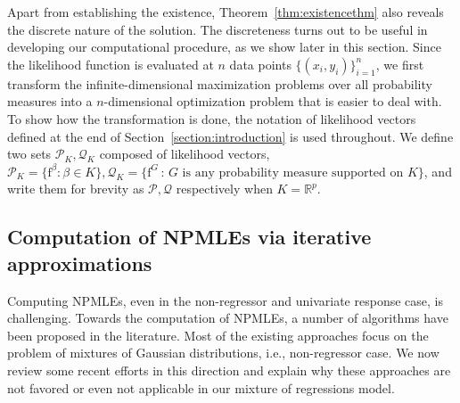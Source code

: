 \documentclass[11pt]{article}
\numberwithin{equation}{section}
\newcommand{\RS}{\mathbb{R}}
\newcommand{\PS}{\mathcal{P}}
\newcommand{\QS}{\mathcal{Q}}
\newcommand{\fv}{\mathrm{f}}
\begin{document}
Apart from establishing the existence, Theorem~\ref{thm:existencethm} also reveals the discrete nature of the solution. The discreteness turns out to be useful in developing our computational procedure, as we show later in this section. Since the likelihood function is evaluated at $n$ data points $\{(x_i,y_i)\}_{i=1}^n$, we first transform the infinite-dimensional maximization problems over all probability measures into a $n$-dimensional optimization problem that is easier to deal with. To show how the transformation is done, the notation of likelihood vectors defined at the end of Section~\ref{section:introduction} is used throughout. We define two sets $\PS_K, \QS_K$ composed of likelihood vectors, $\PS_K = \{ \fv^\beta:\beta \in K \},\QS_K=\{\fv^G \,:\, G \text{ is any probability measure supported on } K\}$, and write them for brevity as $\PS,\QS$ respectively when $K = \RS^p$. 

\subsection{Computation of NPMLEs via iterative approximations}
\label{subsection:computationofnpmle}

Computing NPMLEs, even in the non-regressor and univariate response case, is challenging. Towards the computation of NPMLEs, a number of algorithms have been proposed in the literature. Most of the existing approaches focus on the problem of mixtures of Gaussian distributions, i.e., non-regressor case. We now review some recent efforts in this direction and explain why these approaches are not favored or even not applicable in our mixture of regressions model. 
\end{document}
